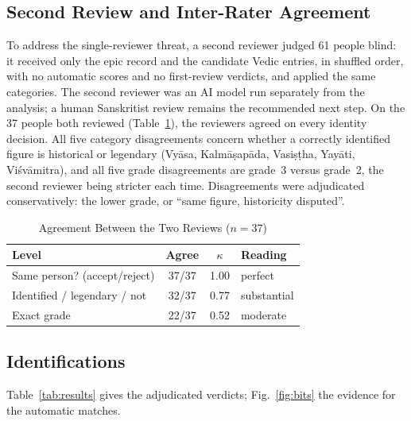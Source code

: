 \documentclass[journal]{IEEEtran}
\begin{document}
\subsection{Second Review and Inter-Rater Agreement}
To address the single-reviewer threat, a second reviewer judged 61 people blind: it received only the epic record and the
candidate Vedic entries, in shuffled order, with no automatic scores and no first-review verdicts, and applied the same
categories. The second reviewer was an AI model run separately from the analysis; a human Sanskritist review remains the
recommended next step. On the 37 people both reviewed (Table~\ref{tab:kappa}), the reviewers agreed on every identity
decision. All five category disagreements concern whether a correctly identified figure is historical or legendary
(Vyāsa, Kalmāṣapāda, Vasiṣṭha, Yayāti, Viśvāmitra), and all five grade disagreements are grade~3 versus grade~2, the second
reviewer being stricter each time. Disagreements were adjudicated conservatively: the lower grade, or ``same figure,
historicity disputed''.

\begin{table}[!t]
\caption{Agreement Between the Two Reviews ($n=37$)}
\label{tab:kappa}
\centering\footnotesize
\begin{tabular}{@{}lccl@{}}
\toprule
Level & Agree & $\kappa$ & Reading \\
\midrule
Same person? (accept/reject) & 37/37 & 1.00 & perfect \\
Identified / legendary / not & 32/37 & 0.77 & substantial \\
Exact grade & 22/37 & 0.52 & moderate \\
\bottomrule
\end{tabular}
\end{table}

\subsection{Identifications}
Table~\ref{tab:results} gives the adjudicated verdicts; Fig.~\ref{fig:bits} the evidence for the automatic matches.
\end{document}
